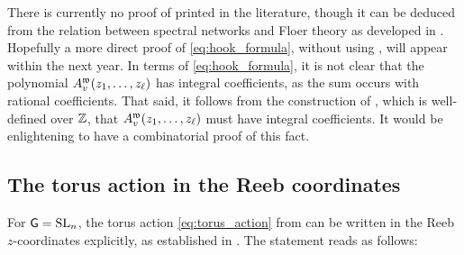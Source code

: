 \noindent There is currently no proof of  printed in the literature, though it can be deduced from the relation between spectral networks and Floer theory as developed in \cite{casals2025spectralnetworksbettilagrangians}. Hopefully a more direct proof of \eqref{eq:hook_formula}, without using \cite{casals2025spectralnetworksbettilagrangians}, will appear within the next year. In terms of \eqref{eq:hook_formula}, it is not clear that the polynomial $A^{\mathfrak{w}}_v(z_1,\ldots,z_\ell)$ has integral coefficients, as the sum occurs with rational coefficients. That said, it follows from the construction of \cite[Section 7.2]{CGGLSS25}, which is well-defined over $\mathbb{Z}$, that $A^{\mathfrak{w}}_v(z_1,\ldots,z_\ell)$ must have integral coefficients. It would be enlightening to have a combinatorial proof of this fact.

\subsection{The torus action in the Reeb coordinates}\label{sssec:torus_action_coordinates} For $\mathsf{G}=\operatorname{SL}_n$, the torus action \eqref{eq:torus_action} from  can be written in the Reeb $z$-coordinates explicitly, as established in \cite[Section 2.2]{CGGJ24}. The statement reads as follows:

